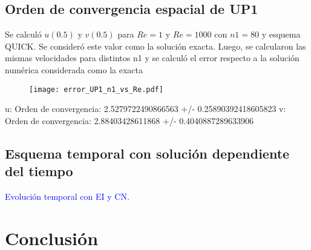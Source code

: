 \documentclass[aps,prb,twocolumn,superscriptaddress,floatfix,longbibliography,10pt]{revtex4-2}
\newcounter{para}
\begin{document}
\subsection{Orden de convergencia espacial de UP1}

Se calculó $u(0.5)$ y $v(0.5)$ para $Re = 1$ y $Re = 1000$ con $n1 = 80$ y esquema QUICK. Se consideró este valor como la solución exacta. Luego, se calcularon las mismas velocidades para distintos n1 y se calculó el error respecto a la solución numérica considerada como la exacta

\begin{figure}[h]
  \texttt{[image: error\_UP1\_n1\_vs\_Re.pdf]}
  \caption{}
   \label{fig:error_UP1_n1_vs_Re}
\end{figure}

u: Orden de convergencia:  2.5279722490866563 +/- 0.25890392418605823
v: Orden de convergencia:  2.88403428611868 +/- 0.4040887289633906


\subsection{Esquema temporal con solución dependiente del tiempo}


\textcolor{blue}{Evolución temporal con EI y CN.}





\section{Conclusión}


\end{document}
